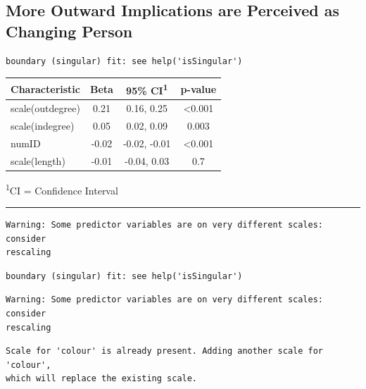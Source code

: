 \documentclass[
  .7em,
  letterpaper,
  DIV=11,
  numbers=noendperiod]{scrartcl}
\begin{document}
\hypertarget{more-outward-implications-are-perceived-as-changing-person}{%
\subsection{More Outward Implications are Perceived as Changing
Person}\label{more-outward-implications-are-perceived-as-changing-person}}

\begin{verbatim}
boundary (singular) fit: see help('isSingular')
\end{verbatim}

\captionsetup[table]{labelformat=empty,skip=1pt}
\setlength{\LTpost}{0mm}
\begin{longtable}{lccc}
\toprule
\textbf{Characteristic} & \textbf{Beta} & \textbf{95\% CI}\textsuperscript{1} & \textbf{p-value} \\ 
\midrule
scale(outdegree) & 0.21 & 0.16, 0.25 & <0.001 \\ 
scale(indegree) & 0.05 & 0.02, 0.09 & 0.003 \\ 
numID & -0.02 & -0.02, -0.01 & <0.001 \\ 
scale(length) & -0.01 & -0.04, 0.03 & 0.7 \\ 
\bottomrule
\end{longtable}
\begin{minipage}{\linewidth}
\textsuperscript{1}CI = Confidence Interval\\
\end{minipage}

\begin{center}\rule{0.5\linewidth}{0.5pt}\end{center}

\begin{verbatim}
Warning: Some predictor variables are on very different scales: consider
rescaling
\end{verbatim}

\begin{verbatim}
boundary (singular) fit: see help('isSingular')
\end{verbatim}

\begin{verbatim}
Warning: Some predictor variables are on very different scales: consider
rescaling
\end{verbatim}

\begin{verbatim}
Scale for 'colour' is already present. Adding another scale for 'colour',
which will replace the existing scale.
\end{verbatim}
\end{document}
